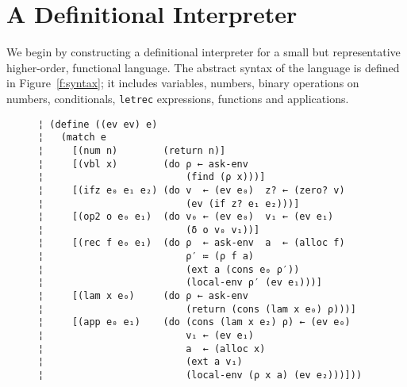 \section{A Definitional Interpreter}\label{s:interp}

We begin by constructing a definitional interpreter for a small but
representative higher-order, functional language.  The abstract syntax
of the language is defined in Figure~\ref{f:syntax}; it includes variables,
numbers, binary operations on numbers, conditionals, {\tt letrec} expressions,
functions and applications.

\begin{figure} %
\begin{mdframed}
\begin{lstlisting}
¦ (define ((ev ev) e)
¦   (match e
¦     [(num n)        (return n)]
¦     [(vbl x)        (do ρ ← ask-env
¦                         (find (ρ x)))]    
¦     [(ifz e₀ e₁ e₂) (do v  ← (ev e₀)  z? ← (zero? v)
¦                         (ev (if z? e₁ e₂)))]
¦     [(op2 o e₀ e₁)  (do v₀ ← (ev e₀)  v₁ ← (ev e₁)
¦                         (δ o v₀ v₁))]
¦     [(rec f e₀ e₁)  (do ρ  ← ask-env  a  ← (alloc f)
¦                         ρ′ ≔ (ρ f a)
¦                         (ext a (cons e₀ ρ′))
¦                         (local-env ρ′ (ev e₁)))]
¦     [(lam x e₀)     (do ρ ← ask-env
¦                         (return (cons (lam x e₀) ρ)))]
¦     [(app e₀ e₁)    (do (cons (lam x e₂) ρ) ← (ev e₀)
¦                         v₁ ← (ev e₁)
¦                         a  ← (alloc x)
¦                         (ext a v₁)
¦                         (local-env (ρ x a) (ev e₂)))]))
\end{lstlisting}
\label{f:interpreter}
\end{mdframed}
\end{figure} %

